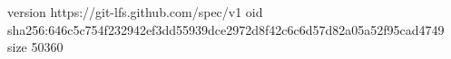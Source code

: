 version https://git-lfs.github.com/spec/v1
oid sha256:646c5c754f232942ef3dd55939dce2972d8f42c6c6d57d82a05a52f95cad4749
size 50360
